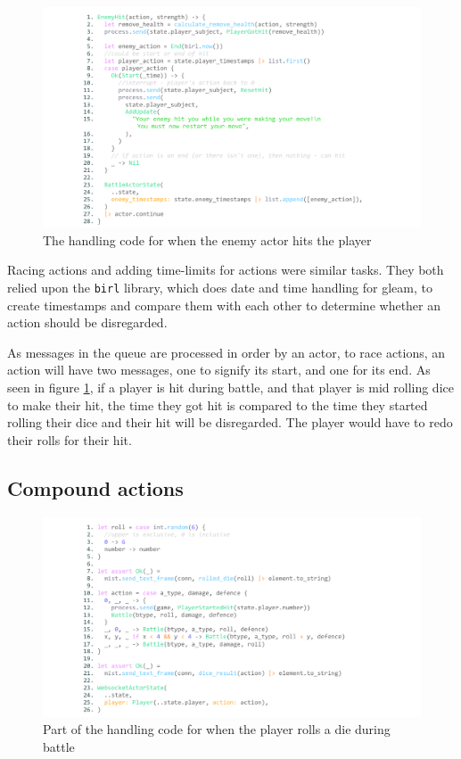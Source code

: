 \documentclass[]{final}
\begin{document}
\begin{figure}[H]
  \centering
  \includegraphics[width=\textwidth]{racing.pdf}
  \caption{The handling code for when the enemy actor hits the player}\label{fig: racing}
\end{figure}

Racing actions and adding time-limits for actions were similar tasks.
They both relied upon the \lstinline|birl| library, which does date and time
handling for gleam, to create timestamps and compare
them with each other to determine whether an action
should be disregarded.

As messages in the queue are processed in order by an actor, to race actions,
an action will have two messages, one to signify its start, and one for its end.
As seen in figure \ref{fig: racing}, if a player is hit during battle, and that player is mid rolling dice to make
their hit, the time they got hit is compared to the time they started rolling
their dice and their hit will be disregarded. The player would have to redo
their rolls for their hit.

\newpage

\subsection{Compound actions}

\begin{figure}[H]
  \centering
  \includegraphics[width=\textwidth]{compound.pdf}
  \caption{Part of the handling code for when the player rolls a die during battle}\label{fig: compound}
\end{figure}
\end{document}
